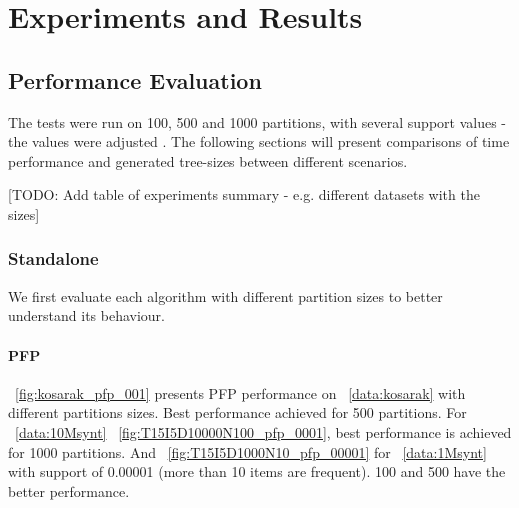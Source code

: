 \section{Experiments and Results}

\subsection{Performance Evaluation}
The tests were run on 100, 500 and 1000 partitions, with several support values - the values were adjusted . The following sections will present comparisons of time performance and generated tree-sizes between different scenarios. 

[TODO: Add table of experiments summary - e.g. different datasets with the sizes]

\subsubsection{Standalone}
\label{sec:resultsstand}
We first evaluate each algorithm with different partition sizes to better understand its behaviour.
\paragraph{PFP}
~\autoref{fig:kosarak_pfp_001} presents PFP performance on ~\autoref{data:kosarak} with different partitions sizes. Best performance achieved for 500 partitions. For ~\autoref{data:10Msynt} ~\autoref{fig:T15I5D10000N100_pfp_0001}, best performance is achieved for 1000 partitions. And ~\autoref{fig:T15I5D1000N10_pfp_00001} for ~\autoref{data:1Msynt} with support of 0.00001 (more than 10 items are frequent). 100 and 500 have the better performance.


